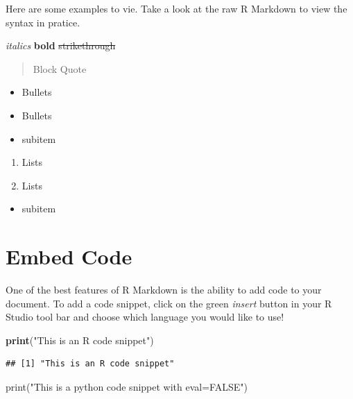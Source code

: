 \documentclass[]{book}
\newenvironment{Shaded}{\begin{snugshade}}{\end{snugshade}}
\newcommand{\KeywordTok}[1]{\textcolor[rgb]{0.13,0.29,0.53}{\textbf{#1}}}
\newcommand{\StringTok}[1]{\textcolor[rgb]{0.31,0.60,0.02}{#1}}
\newcommand{\BuiltInTok}[1]{#1}
\newcommand{\NormalTok}[1]{#1}
\providecommand{\tightlist}{%
  \setlength{\itemsep}{0pt}\setlength{\parskip}{0pt}}
\begin{document}
Here are some examples to vie. Take a look at the raw R Markdown to view
the syntax in pratice.

\emph{italics} \textbf{bold} \sout{strikethrough}

\begin{quote}
Block Quote
\end{quote}

\begin{itemize}
\tightlist
\item
  Bullets
\item
  Bullets
\item
  subitem
\end{itemize}

\begin{enumerate}
\def\labelenumi{\arabic{enumi}.}
\tightlist
\item
  Lists
\item
  Lists
\end{enumerate}

\begin{itemize}
\tightlist
\item
  subitem
\end{itemize}

\section{Embed Code}\label{embed-code}

One of the best features of R Markdown is the ability to add code to
your document. To add a code snippet, click on the green \emph{insert}
button in your R Studio tool bar and choose which language you would
like to use!

\begin{Shaded}
\begin{Highlighting}[]
\KeywordTok{print}\NormalTok{(}\StringTok{"This is an R code snippet"}\NormalTok{)}
\end{Highlighting}
\end{Shaded}

\begin{verbatim}
## [1] "This is an R code snippet"
\end{verbatim}

\begin{Shaded}
\begin{Highlighting}[]
\BuiltInTok{print}\NormalTok{(}\StringTok{"This is a python code snippet with eval=FALSE"}\NormalTok{)}
\end{Highlighting}
\end{Shaded}
\end{document}
